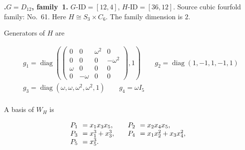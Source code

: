 \documentclass[12pt]{amsart}
\makeatletter
\numberwithin{equation}{section}
\theoremstyle{plain}
\theoremstyle{definition}
\theoremstyle{remark}
\DeclareMathOperator{\diag}{diag}
\newcommand{\PBasisLabel}[1]{\mathrlap{P_{#1}}\phantom{P_{99}}}
\newenvironment{SecEightAlignedBasis}[1]{%
  \begingroup\renewcommand{\arraystretch}{1.18}%
  \[\begin{array}{@{}#1@{}}%
}{\end{array}\]\endgroup}
\newenvironment{familydisplay}{%
  \begingroup
  \setlength{\arraycolsep}{1.35pt}%
  \renewcommand{\arraystretch}{0.96}%
  \setlength{\jot}{2pt}%
}{\endgroup}
\newcommand{\smat}[1]{\left(\begin{smallmatrix}#1\end{smallmatrix}\right)}
\makeatother
\begin{document}
\par{}\medskip\noindent\textbf{.\enspace $G=D_{12}$, family~1.}\label{fam:threefold-no-13}
$G\text{-ID}=[12,4]$, $H\text{-ID}=[36,12]$.
Source cubic fourfold family: No.~61.  Here
$H\cong S_3\times C_6$.
The family dimension is $2$.
\par\smallskip\noindent Generators of $H$ are\par\nopagebreak
\begin{familydisplay}
\begin{align*}
&g_{1}=\diag\!\left(\smat{0&0&\omega^2&0\\0&0&0&-\omega^2\\\omega&0&0&0\\0&-\omega&0&0},1\right)
\qquad g_{2}=\diag(1,-1,1,-1,1)\\
&g_{3}=\diag(\omega,\omega,\omega^2,\omega^2,1)
\qquad g_{4}=\omega I_5\\
\end{align*}
\end{familydisplay}
\par\smallskip\noindent A basis of $W_H$ is\par\nopagebreak
\begin{familydisplay}
\begin{SecEightAlignedBasis}{l@{\qquad}l}
\PBasisLabel{1}=x_{1}x_{3}x_{5}, & \PBasisLabel{2}=x_{2}x_{4}x_{5},\\
\PBasisLabel{3}=x_{1}^{3}+x_{3}^{3}, & \PBasisLabel{4}=x_{1}x_{2}^{2}+x_{3}x_{4}^{2},\\
\multicolumn{2}{@{}l@{}}{\PBasisLabel{5}=x_{5}^{3}.}
\end{SecEightAlignedBasis}
\end{familydisplay}
\end{document}
